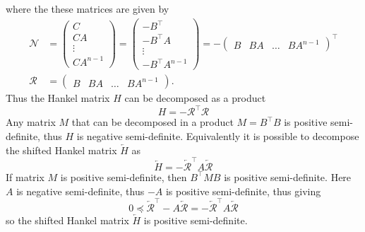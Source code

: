 where the these matrices are given by 
\begin{align}
    \mathcal{N} &= 
    \begin{pmatrix}
        C \\
        CA \\
        \vdots \\
        CA^{n-1}
    \end{pmatrix}
     =   
    \begin{pmatrix}
        -B^{\top} \\
        -B^{\top}A \\
        \vdots \\
        -B^{\top}A^{n-1}
    \end{pmatrix}
     = -
    \begin{pmatrix}
        B & BA & \ldots & BA^{n-1}
    \end{pmatrix}^{\top} \\
    \mathcal{R} &=     
    \begin{pmatrix}
        B & BA & \ldots & BA^{n-1}
    \end{pmatrix}.
\end{align}
Thus the Hankel matrix $H$ can be decomposed as a product
\begin{equation}
    H = -\mathcal{R}^{\top}\mathcal{R}
\end{equation}
Any matrix $M$ that can be decomposed in a product $M = B^{\top}B$ is positive semi-definite, thus $H$ is negative semi-definite.
Equivalently it is possible to decompose the shifted Hankel matrix $\overleftarrow{H}$ as 
\begin{equation}
    \overleftarrow{H} = -\overleftarrow{\mathcal{R}}^{\top}A\overleftarrow{\mathcal{R}}
\end{equation}
If matrix $M$ is positive semi-definite, then $B^{\top}MB$ is positive semi-definite. Here $A$ is negative semi-definite, thus $-A$ is positive semi-definite, thus giving
\begin{equation}
    0 \preceq \overleftarrow{\mathcal{R}}^{\top}-A\overleftarrow{\mathcal{R}} = - \overleftarrow{\mathcal{R}}^{\top}A\overleftarrow{\mathcal{R}}
\end{equation}
so the shifted Hankel matrix $\overleftarrow{H}$ is positive semi-definite.

